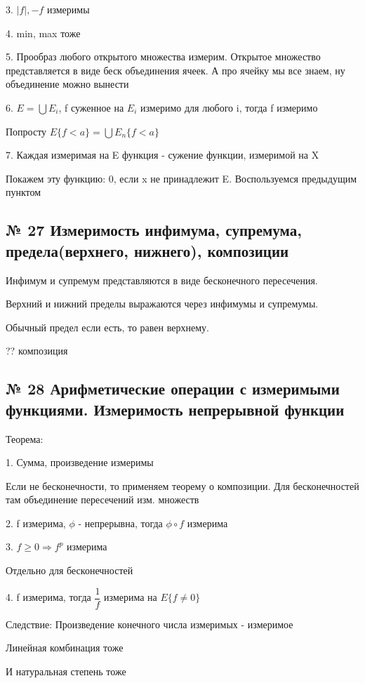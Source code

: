 \documentclass{article}
\begin{document}
3. $|f|, -f$ измеримы

4. min, max тоже

5. Прообраз любого открытого множества измерим. Открытое множество представляется в виде беск объединения ячеек. А про ячейку мы все знаем, ну объединение можно вынести

6. $E = \bigcup E_i$, f суженное на $E_i$ измеримо для любого i, тогда f измеримо

Попросту $E\{f < a\} = \bigcup{E_n{\{f < a\}}}$

7. Каждая измеримая на E функция - сужение функции, измеримой на X

Покажем эту функцию: 0, если x не принадлежит E. Воспользуемся предыдущим пунктом

\subsection{ \footnotesize № 27 Измеримость инфимума, супремума, предела(верхнего, нижнего), композиции}

Инфимум и супремум представляются в виде бесконечного пересечения.

Верхний и нижний пределы выражаются через инфимумы и супремумы.

Обычный предел если есть, то равен верхнему.

?? композиция

\subsection{ \footnotesize № 28 Арифметические операции с измеримыми функциями. Измеримость непрерывной функции}

Теорема: 

1. Сумма, произведение измеримы

Если не бесконечности, то применяем теорему о композиции. Для бесконечностей там объединение пересечений изм. множеств

2. f измерима, $\phi$ - непрерывна, тогда $\phi \circ f$ измерима

3. $f \geq 0 \Rightarrow f^p$ измерима

Отдельно для бесконечностей

4. f измерима, тогда $\dfrac{1}{f}$ измерима на $E\{f \neq 0\}$

Следствие: Произведение конечного числа измеримых - измеримое

Линейная комбинация тоже

И натуральная степень тоже
\end{document}
